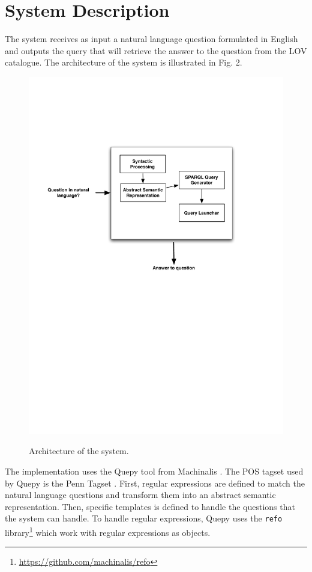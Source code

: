 \documentclass[runningheads,a4paper]{llncs}
\begin{document}
\section{System Description}
\label{sec:system}

The system receives as input a natural language question formulated in English
and outputs the query that will retrieve the answer to the question from the
LOV catalogue. The architecture of the system is illustrated in Fig. 2.

\begin{figure}[ht!b]
\centering
\caption{Architecture of the system.}
\includegraphics[scale=.6]{qa4lov-archi.pdf}
\label{fig:q4lovarchi}
\end{figure}

The implementation uses the Quepy tool from Machinalis \cite{quepy2012}. The POS tagset used by Quepy is the Penn Tagset \cite{marcus1993building}. First, regular expressions are defined to match the natural language questions and transform them into an abstract semantic representation. Then, specific templates is defined to handle the questions that the system can handle. To handle regular expressions, Quepy uses the \texttt{refo} library\footnote{\url{https://github.com/machinalis/refo}} which work with regular expressions as objects. 
\end{document}
